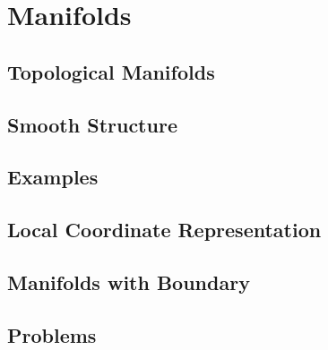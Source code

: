 \chapter{Manifolds}
\section{Topological Manifolds}
\section{Smooth Structure}
\section{Examples}
\section{Local Coordinate Representation}
\section{Manifolds with Boundary}
\section{Problems}